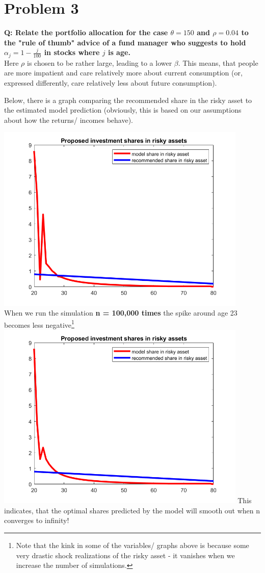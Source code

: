 \documentclass[12pt,a4paper]{article}
\begin{document}
\section*{Problem 3}
\textbf{Q: Relate the portfolio allocation for the case $\theta = 150$ and $\rho = 0.04$ to the "rule of thumb" advice of a fund manager who suggests to hold $\alpha_j = 1- \frac{j}{100}$ in stocks where $j$ is age.}\\

Here $\rho$ is chosen to be rather large, leading to a lower $\beta$. This means, that people are more impatient and care relatively more about current consumption (or, expressed differently, care relatively less about future consumption).

Below, there is a graph comparing the recommended share in the risky asset to the estimated model prediction (obviously, this is based on our assumptions about how the returns/ incomes behave).

\includegraphics[width = 0.9\textwidth]{PS3/sharesriskyasset.png}
\\
When we run the simulation \textbf{n = 100,000 times} the spike around age 23 becomes less negative\footnote{Note that the kink in some of the variables/ graphs above is because some very drastic shock realizations of the risky asset - it vanishes when we increase the number of simulations.}\\
\includegraphics[width = 0.9\textwidth]{PS3/sharesriskyassetns100000.png}
This indicates, that the optimal shares predicted by the model will smooth out when n converges to infinity!
\end{document}
